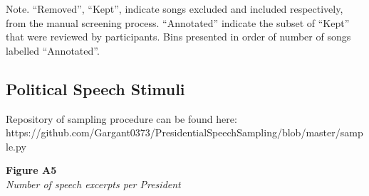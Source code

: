 \documentclass[
  man]{apa7}
\begin{document}
{Note. ``Removed'', ``Kept'', indicate songs excluded and included
respectively, from the manual screening process. ``Annotated'' indicate
the subset of ``Kept'' that were reviewed by participants. Bins
presented in order of number of songs labelled ``Annotated''. }

\subsection{Political Speech Stimuli}\label{political-speech-stimuli}

Repository of sampling procedure can be found here:
https://github.com/Gargant0373/PresidentialSpeechSampling/blob/master/sample.py

{\textbf{Figure A5}\\
\emph{Number of speech excerpts per President}}
\end{document}
